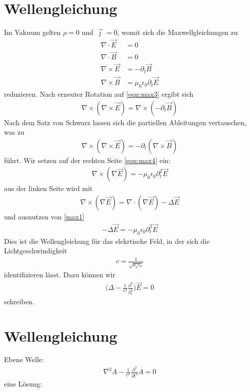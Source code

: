 \documentclass{scrartcl}
\begin{document}
 \section{Wellengleichung}
Im Vakuum gelten $\rho=0$ und $\vec{\jmath}=0$, womit sich die
Maxwellgleichungen zu
 \begin{align}
\nabla\cdot\vec{E} &= 0     \label{eqn:max1}\\
\nabla\cdot\vec{B} &= 0   \label{eqn:max2}  \\
\nabla\times\vec{E} &= -\partial_t\vec{B} \label{eqn:max3} \\
\nabla\times\vec{B} &= \mu_0\epsilon_0\partial_t{\vec{E}} \label{eqn:max4}
 \end{align}
 reduzieren. Nach erneuter Rotation auf \eqref{eqn:max3} ergibt sich
 \begin{align}
   \nabla\times(\nabla\times\vec{E}) = \nabla\times(-\partial_t\vec{B})
   \label{eqn:9}
 \end{align}
 Nach dem Satz von Schwarz lassen sich die partiellen Ableitungen
 vertauschen, was zu
 \begin{align}
   \nabla\times(\nabla\times\vec{E}) = -\partial_t(\nabla\times\vec{B})
   \label{eqn:10}
 \end{align}
 führt. Wir setzen auf der rechten Seite \eqref{eqn:max4} ein:
 \begin{align}
   \nabla\times(\nabla\vec{E})=-\mu_0\epsilon_0\partial_t^2\vec{E}
   \label{eqn:11}
 \end{align}
 aus der linken Seite wird mit
 \begin{align}
 \nabla\times(\nabla\vec{E})= \nabla\cdot(\nabla\vec{E})- \Delta\vec{E}
 \label{eqn:12}
 \end{align}
 und ausnutzen von \eqref{max1}
 \begin{align}
   -\Delta\vec{E}=-\mu_0\epsilon_0\partial_t^2\vec{E}
   \label{eqn:13}
 \end{align}
 Dies ist die Wellengleichung für das elekrtische Feld,
 in der sich die Lichtgeschwindigkeit
 \begin{align}
 c=\frac{1}{\sqrt{\mu_0\epsilon_0}} \label{eqn:14}
\end{align}
identifizieren lässt. Dazu können wir
\begin{align}
  \biggl(\Delta-\frac{1}{c^2}\frac{\partial^2}{\partial_t^2}\biggr)\vec{E}=0
\end{align}
\label{eqn:15}
schreiben.

\section{Wellengleichung}
Ebene Welle:
\begin{align}
  \nabla^2 A - \frac{1}{c^2}\frac{\partial^2}{\partial t^2}A= 0
\end{align}
eine Lösung:
\end{document}
